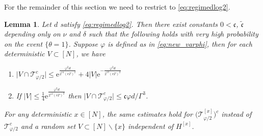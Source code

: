 \documentclass[10pt,a4paper]{amsart}
\newcommand{\ee}{\mathrm{e}}
\newcommand{\abs}[1]{\left| #1 \right|}
\newcommand{\absn}[1]{\bigl| #1 \bigr|} %
\newcommand{\ccc}{\mathfrak{c}}
\newtheorem{lemma}{Lemma}[section]
\numberwithin{equation}{section}
\newcommand*\bset[1]{[#1]}
\begin{document}
For the remainder of this section we need to restrict to \cref{eq:regimedlog2}.
\begin{lemma}\label{lem:controlatypicalvertices}
 Let $d$ satisfy \cref{eq:regimedlog2}.
		Then there exist constants $0 < \ccc$, $\tilde{\ccc}$ depending only on $\nu$ and $\delta$  such that the following holds with very high probability on the event $\{\theta =1\}$. Suppose $\varphi$ is defined as in \cref{eq:new_varphi},
	 then for each deterministic $V \subset [N]$, 
		 we have 
		\begin{enumerate}[label=(\roman*)]
			\item \label{(i)}$ \absn{V\cap \mathcal{T}_{\varphi/2}^{c}} \le  \ee^{\frac{\varphi^2d}{2^{14} (\ee\Gamma)^2}}  + 4\abs{V} \ee^{-\frac{\varphi^2d}{2^{13} (\ee\Gamma)^2}} $
			\item \label{(ii)} If $\absn{V} \le \frac{1}{4} \ee^{\frac{\varphi^2 d }{2^{13} (\ee\Gamma)^2}} $ then $\absn{V \cap \mathcal{T}_{\varphi/2}^c} \le \ccc\varphi d/ \Gamma^3$. 
		
		\end{enumerate}
		For any deterministic $x \in [N]$, the same estimates hold for $\bigl(\mathcal{T}_{\varphi/2}^{\bset{x}}\bigr)^c$ instead of $\mathcal{T}_{\varphi/2}^{c}$ and a random set $V \subset [N] \backslash \{x\}$ independent of $H^{\bset{x}}$.
	\end{lemma}
	
\end{document}
